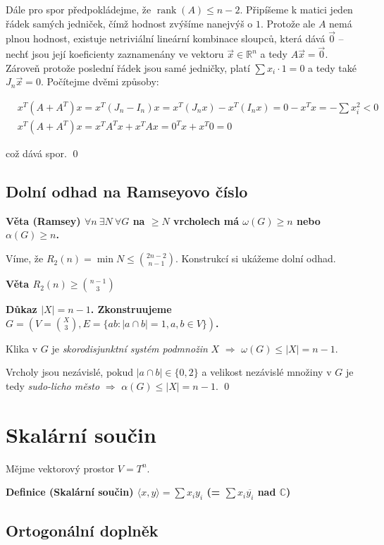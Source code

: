 \documentclass[a4paper,12pt,titlepage]{article}
\newcommand{\dk}{\smallskip\noindent\bf Důkaz\rm{} }
\newcommand{\df}{\smallskip\noindent\bf Definice\rm{} }
\newcommand{\vt}{\smallskip\noindent\bf Věta\rm{} }
\newcommand{\C}{\mathbb{C}}
\newcommand{\R}{\mathbb{R}}
\DeclareMathOperator{\rank}{rank}
\newcommand{\sk}[1]{\langle #1\rangle}
\begin{document}
Dále pro spor předpokládejme, že $\rank(A) \leq n-2$. Připíšeme k matici jeden 
řádek samých jedniček, čímž hodnost zvýšíme nanejvýš o $1$. Protože ale $A$ nemá 
plnou hodnost, existuje netriviální lineární kombinace sloupců, která dává 
$\vec{0}$ -- nechť jsou její koeficienty zaznamenány ve vektoru $\vec{x} \in 
\R^n$ a tedy $A\vec{x}=\vec{0}$. Zároveň protože poslední řádek jsou samé 
jedničky, platí $\sum x_i \cdot 1 = 0$ a tedy také $J_n\vec{x} = 0$. Počítejme 
dvěmi způsoby:

\begin{align}
	&x^T(A + A^T) x = x^T(J_n - I_n)x = x^T(J_nx) - x^T(I_nx) = 0 - x^T x = - 
	\sum x_i^2 < 0 \\
	&x^T(A+A^T) x = x^TA^Tx + x^TAx = 0^Tx + x^T0 = 0
\end{align}

což dává spor. \qed

\subsection{Dolní odhad na Ramseyovo číslo}
\vt (Ramsey) $\forall n\ \exists N\ \forall G$ na $\ge N$ vrcholech má $\omega(G) \ge n$ nebo $\alpha(G) \ge n$.

Víme, že $R_2(n) = \min N \le {2n-2\choose n-1}$. Konstrukcí si ukážeme dolní odhad.

\vt $R_2(n) \ge {n-1\choose 3}$

\dk $|X| = n-1$. Zkonstruujeme $G=\left(V={X\choose 3}, E=\{ab: |a\cap b|=1, a,b\in V\}\right)$.

Klika v $G$ je {\it skorodisjunktní systém podmnožin} $X$ $\Rightarrow$ $\omega(G) \le |X| = n-1$.

Vrcholy jsou nezávislé, pokud $|a\cap b| \in \{0,2\}$ a velikost nezávislé množiny 
v $G$ je tedy {\it sudo-licho město} $\Rightarrow$ $\alpha(G) \le |X| = n-1$.
\qed

\section{Skalární součin}

Mějme vektorový prostor $V = T^n$.

\df (Skalární součin) $\sk{x,y} = \sum x_iy_i$ \quad(= $\sum x_i\overline{y_i}$ nad $\C$)

\subsection{Ortogonální doplněk}
\end{document}
